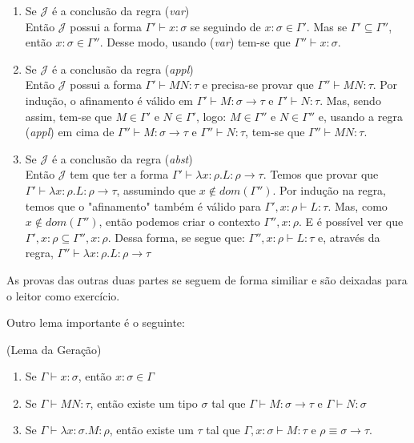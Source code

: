 \documentclass[../main.tex]{subfiles}
\begin{document}
\begin{enumerate}
    \item Se $\mathcal{J}$ é a conclusão da regra (\emph{var}) \\
    Então $\mathcal{J}$ possui a forma $\Gamma' \vdash x : \sigma$ se seguindo de $x : \sigma \in \Gamma'$. Mas se $\Gamma' \subseteq \Gamma''$, então $x : \sigma \in \Gamma''$. Desse modo, usando (\emph{var}) tem-se que $\Gamma'' \vdash x : \sigma$. 
    \item Se $\mathcal{J}$ é a conclusão da regra (\emph{appl}) \\
    Então $\mathcal{J}$ possui a forma $\Gamma' \vdash MN : \tau$ e precisa-se provar que $\Gamma'' \vdash MN : \tau$. Por indução, o afinamento é válido em $\Gamma' \vdash M : \sigma \to \tau$ e $\Gamma' \vdash N : \tau$. Mas, sendo assim, tem-se que $M \in \Gamma'$ e $N \in \Gamma'$, logo: $M \in \Gamma''$ e $N \in \Gamma''$ e, usando a regra  (\emph{appl}) em cima de $\Gamma'' \vdash M : \sigma \to \tau$ e $\Gamma'' \vdash N : \tau$, tem-se que $\Gamma'' \vdash MN : \tau$. 
    \item Se $\mathcal{J}$ é a conclusão da regra (\emph{abst}) \\
    Então $\mathcal{J}$ tem que ter a forma $\Gamma' \vdash \lambda x : \rho . L : \rho \to \tau$. Temos que provar que $\Gamma' \vdash \lambda x : \rho . L : \rho \to \tau$, assumindo que $x \not\in dom(\Gamma'')$. Por indução na regra, temos que o "afinamento" também é válido para $\Gamma', x : \rho \vdash L : \tau$. Mas, como $x \not\in dom(\Gamma'')$, então podemos criar o contexto $\Gamma'', x : \rho$. E é possível ver que $\Gamma', x : \rho \subseteq \Gamma'', x : \rho$. Dessa forma, se segue que: $\Gamma'', x : \rho \vdash L : \tau$ e, através da regra, $\Gamma'' \vdash \lambda x : \rho . L : \rho \to \tau$
\end{enumerate}

As provas das outras duas partes se seguem de forma similiar e são deixadas para o leitor como exercício.

Outro lema importante é o seguinte:

\begin{lemma}(Lema da Geração)
    \hfill
    \begin{enumerate}
        \item Se $\Gamma \vdash x : \sigma$, então $x : \sigma \in \Gamma$
        \item Se $\Gamma \vdash MN : \tau$, então existe um tipo $\sigma$ tal que $\Gamma \vdash M : \sigma \to \tau$ e $\Gamma \vdash N : \sigma $
        \item Se $\Gamma \vdash \lambda x : \sigma . M : \rho$, então existe um $\tau$ tal que $\Gamma, x : \sigma \vdash M : \tau$ e $\rho \equiv \sigma \to \tau$.
    \end{enumerate}
\end{lemma}
\end{document}
